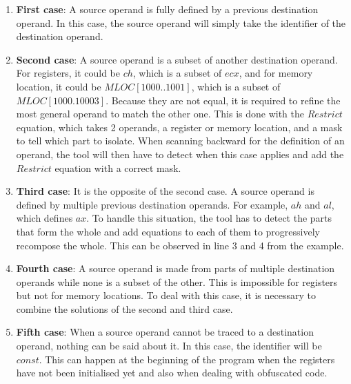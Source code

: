 \begin{enumerate}
	\item \textbf{First case}: A source operand is fully defined by a previous destination operand. In this case, the source operand will simply take the identifier of the destination operand.
	\item \textbf{Second case}: A source operand is a subset of another destination operand. For registers, it could be $ch$, which is a subset of $ecx$, and for memory location, it could be $MLOC[1000..1001]$, which is a subset of $MLOC[1000.10003]$. Because they are not equal, it is required to refine the most general operand to match the other one. This is done with the $Restrict$ equation, which takes 2 operands, a register or memory location, and a mask to tell which part to isolate. When scanning backward for the definition of an operand, the tool will then have to detect when this case applies and add the $Restrict$ equation with a correct mask.
	\item \textbf{Third case}: It is the opposite of the second case. A source operand is defined by multiple previous destination operands. For example, $ah$ and $al$, which defines $ax$. To handle this situation, the tool has to detect the parts that form the whole and add equations to each of them to progressively recompose the whole. This can be observed in line 3 and 4 from the example.
	\item \textbf{Fourth case}: A source operand is made from parts of multiple destination operands while none is a subset of the other. This is impossible for registers but not for memory locations. To deal with this case, it is necessary to combine the solutions of the second and third case.
	\item \textbf{Fifth case}: When a source operand cannot be traced to a destination operand, nothing can be said about it. In this case, the identifier will be $const$. This can happen at the beginning of the program when the registers have not been initialised yet and also when dealing with obfuscated code.
\end{enumerate}

